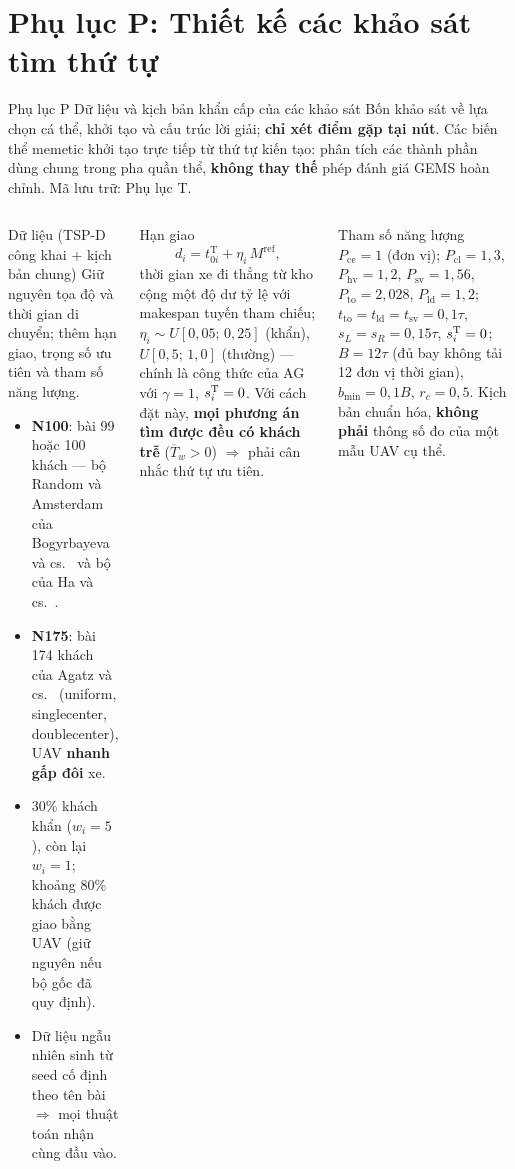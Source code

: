 \documentclass[aspectratio=169,10pt,t,xcolor={table}]{beamer}
\newcommand{\meanT}{\overline{T}_{\!w}}
\newcommand{\Mref}{M^{\mathrm{ref}}}
\newcommand{\tT}{t^{\mathrm{T}}}
\newcommand{\sub}[1]{_{\mathrm{#1}}}
\newcommand{\apptitle}[2]{Phụ lục #1 \textperiodcentered{} #2}
\begin{document}
\section{Phụ lục P: Thiết kế các khảo sát tìm thứ tự}

\begin{frame}[label=appP]{\apptitle{P}{Dữ liệu và kịch bản khẩn cấp của các khảo sát}}
\footnotesize Bốn khảo sát về lựa chọn cá thể, khởi tạo và cấu trúc lời giải; \textbf{chỉ xét điểm gặp tại nút}. Các biến thể memetic khởi tạo trực tiếp từ thứ tự kiến tạo: phân tích các thành phần dùng chung trong pha quần thể, \textbf{không thay thế} phép đánh giá GEMS hoàn chỉnh. Mã lưu trữ: Phụ lục T.
\begin{columns}[T,onlytextwidth]
\begin{block}{Dữ liệu (TSP-D công khai + kịch bản chung)}
\scriptsize Giữ nguyên tọa độ và thời gian di chuyển; thêm hạn giao, trọng số ưu tiên và tham số năng lượng.
\begin{itemize}
\item \textbf{N100}: bài 99 hoặc 100 khách --- bộ Random và Amsterdam của Bogyrbayeva và cs.~\cite{bogyrbayeva2023} và bộ của Ha và cs.~\cite{ha2020}.
\item \textbf{N175}: bài 174 khách của Agatz và cs.~\cite{agatz2018} (uniform, singlecenter, doublecenter), UAV \textbf{nhanh gấp đôi} xe.
\item 30\% khách khẩn ($w_i=5$), còn lại $w_i=1$; khoảng 80\% khách được giao bằng UAV (giữ nguyên nếu bộ gốc đã quy định).
\item Dữ liệu ngẫu nhiên sinh từ seed cố định theo tên bài $\Rightarrow$ mọi thuật toán nhận cùng đầu vào.
\end{itemize}
\end{block}
\begin{block}{Hạn giao}
\scriptsize
\[
d_i=\tT_{0i}+\eta_i\,\Mref,
\]
thời gian xe đi thẳng từ kho cộng một độ dư tỷ lệ với makespan tuyến tham chiếu; $\eta_i\sim U[0{,}05;\,0{,}25]$ (khẩn), $U[0{,}5;\,1{,}0]$ (thường) --- chính là công thức của AG với $\gamma=1$, $s^{\rm T}_i=0$. Với cách đặt này, \textbf{mọi phương án tìm được đều có khách trễ} ($\meanT>0$) $\Rightarrow$ phải cân nhắc thứ tự ưu tiên.
\end{block}
\begin{block}{Tham số năng lượng}
\scriptsize $P\sub{ce}=1$ (đơn vị); $P\sub{cl}=1{,}3$, $P\sub{hv}=1{,}2$, $P\sub{sv}=1{,}56$, $P\sub{to}=2{,}028$, $P\sub{ld}=1{,}2$; $t\sub{to}=t\sub{ld}=t\sub{sv}=0{,}1\tau$, $s_L=s_R=0{,}15\tau$, $s^{\rm T}_i=0$; $B=12\tau$ (đủ bay không tải 12 đơn vị thời gian), $b_{\min}=0{,}1B$, $r_c=0{,}5$. Kịch bản chuẩn hóa, \textbf{không phải} thông số đo của một mẫu UAV cụ thể.
\end{block}
\end{columns}
\end{frame}
\end{document}
